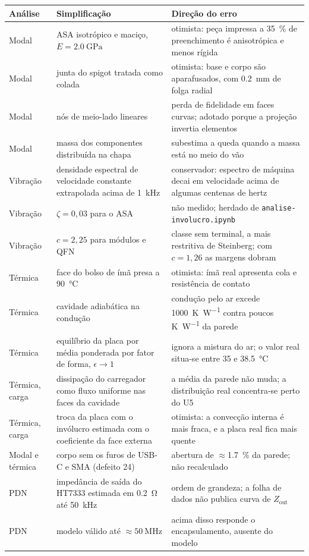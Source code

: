 \documentclass[10pt,a4paper,landscape]{article}
\newcommand{\arq}[1]{\texttt{#1}}
\begin{document}
\begin{table}[H]\footnotesize
\begin{tabularx}{\textwidth}{@{}Y{0.600} Y{1.286} Y{1.114}@{}}
\toprule
\textbf{Análise} & \textbf{Simplificação} & \textbf{Direção do erro} \\
\midrule
Modal & ASA isotrópico e maciço, $E=\SI{2.0}{\giga\pascal}$ & otimista: peça impressa a \SI{35}{\percent} de preenchimento é anisotrópica e menos rígida \\
Modal & junta do spigot tratada como colada & otimista: base e corpo são aparafusados, com \SI{0.2}{\milli\meter} de folga radial \\
Modal & nós de meio-lado lineares & perda de fidelidade em faces curvas; adotado porque a projeção invertia elementos \\
Modal & massa dos componentes distribuída na chapa & subestima a queda quando a massa está no meio do vão \\
Vibração & densidade espectral de velocidade constante extrapolada acima de \SI{1}{\kilo\hertz} & conservador: espectro de máquina decai em velocidade acima de algumas centenas de hertz \\
Vibração & $\zeta=0{,}03$ para o ASA & não medido; herdado de \arq{analise-involucro.ipynb} \\
Vibração & $c=2{,}25$ para módulos e QFN & classe sem terminal, a mais restritiva de Steinberg; com $c=1{,}26$ as margens dobram \\
Térmica & face do bolso de ímã presa a \SI{90}{\celsius} & otimista: ímã real apresenta cola e resistência de contato \\
Térmica & cavidade adiabática na condução & condução pelo ar excede \SI{1000}{\kelvin\per\watt} contra poucos \si{\kelvin\per\watt} da parede \\
Térmica & equilíbrio da placa por média ponderada por fator de forma, $\epsilon\to1$ & ignora a mistura do ar; o valor real situa-se entre 35 e \SI{38.5}{\celsius} \\
Térmica, carga & dissipação do carregador como fluxo uniforme nas faces da cavidade & a média da parede não muda; a distribuição real concentra-se perto do U5 \\
Térmica, carga & troca da placa com o invólucro estimada com o coeficiente da face externa & otimista: a convecção interna é mais fraca, e a placa real fica mais quente \\
Modal e térmica & corpo sem os furos de USB-C e SMA (defeito 24) & abertura de $\approx$\SI{1.7}{\percent} da parede; não recalculado \\
PDN & impedância de saída do HT7333 estimada em \SI{0.2}{\ohm} até \SI{50}{\kilo\hertz} & ordem de grandeza; a folha de dados não publica curva de $Z_\text{out}$ \\
PDN & modelo válido até $\approx\SI{50}{\mega\hertz}$ & acima disso responde o encapsulamento, ausente do modelo \\
\bottomrule
\end{tabularx}
\end{table}
\end{document}
